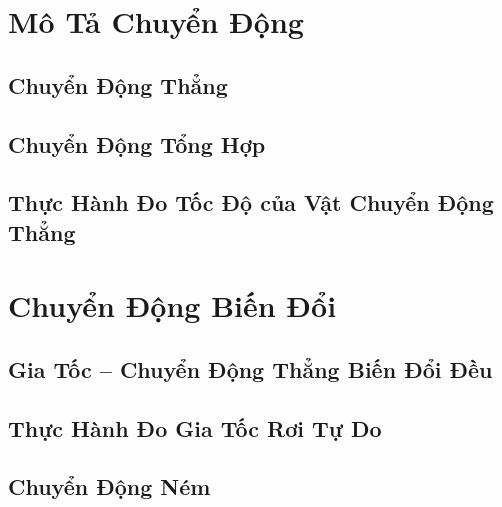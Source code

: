 \documentclass[oneside]{book}
\numberwithin{equation}{section}
\begin{document}

\chapter{Mô Tả Chuyển Động}

\section{Chuyển Động Thẳng}


\section{Chuyển Động Tổng Hợp}


\section{Thực Hành Đo Tốc Độ của Vật Chuyển Động Thẳng}


\chapter{Chuyển Động Biến Đổi}

\section{Gia Tốc -- Chuyển Động Thẳng Biến Đổi Đều}


\section{Thực Hành Đo Gia Tốc Rơi Tự Do}


\section{Chuyển Động Ném}
\end{document}
